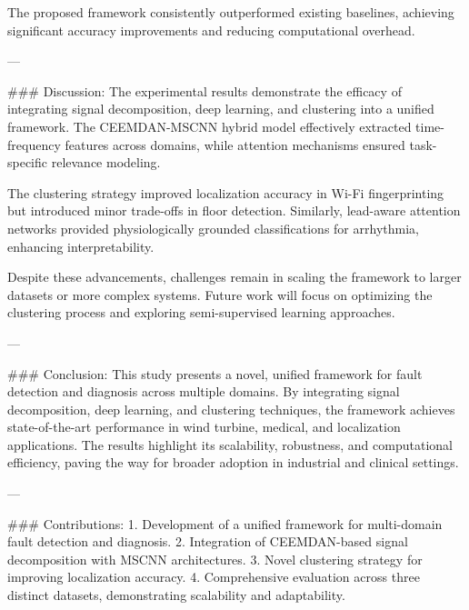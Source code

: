 The proposed framework consistently outperformed existing baselines, achieving significant accuracy improvements and reducing computational overhead.

---

### Discussion:
The experimental results demonstrate the efficacy of integrating signal decomposition, deep learning, and clustering into a unified framework. The CEEMDAN-MSCNN hybrid model effectively extracted time-frequency features across domains, while attention mechanisms ensured task-specific relevance modeling.

The clustering strategy improved localization accuracy in Wi-Fi fingerprinting but introduced minor trade-offs in floor detection. Similarly, lead-aware attention networks provided physiologically grounded classifications for arrhythmia, enhancing interpretability.

Despite these advancements, challenges remain in scaling the framework to larger datasets or more complex systems. Future work will focus on optimizing the clustering process and exploring semi-supervised learning approaches.

---

### Conclusion:
This study presents a novel, unified framework for fault detection and diagnosis across multiple domains. By integrating signal decomposition, deep learning, and clustering techniques, the framework achieves state-of-the-art performance in wind turbine, medical, and localization applications. The results highlight its scalability, robustness, and computational efficiency, paving the way for broader adoption in industrial and clinical settings.

---

### Contributions:
1. Development of a unified framework for multi-domain fault detection and diagnosis.
2. Integration of CEEMDAN-based signal decomposition with MSCNN architectures.
3. Novel clustering strategy for improving localization accuracy.
4. Comprehensive evaluation across three distinct datasets, demonstrating scalability and adaptability.

